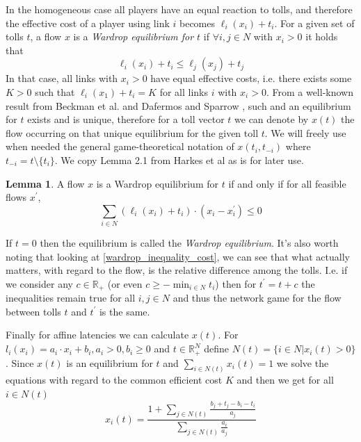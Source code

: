 \documentclass[10pt,a4paper]{book}
\newcommand{\R}{\mathbb{R}}
\theoremstyle{definition}
\newtheorem{lemma}[definition]{Lemma}
\theoremstyle{comment}
\begin{document}
In the homogeneous case all players have an equal reaction to tolls, and therefore the effective cost of a player using link $i$ becomes $\ell_i(x_i) + t_i$.
For a given set of tolls $t$, a flow $x$ is a \textit{Wardrop equilibrium for $t$} if $\forall i, j \in N$ with $x_i > 0$ it holds that
\begin{equation}
	\label{wardrop_inequality_cost}
	\ell_i(x_i) + t_i \leq \ell_j(x_j) + t_j
\end{equation}
In that case, all links with $x_i > 0$ have equal effective costs, i.e. there exists some $K > 0$ such that $\ell_i(x_1) + t_i = K$ for all links $i$ with $x_i > 0$.
From a well-known result from Beckman et al. \cite{beckmann1956studies} and Dafermos and Sparrow \cite{1363388843888284416}, such and an equilibrium for $t$ exists and is unique, therefore for a toll vector $t$ we can denote by $x(t)$ the flow occurring on  that unique equilibrium for the given toll $t$.
We will freely use when needed the general game-theoretical notation of $x(t_i, t_{-i})$ where $t_{-i} = t \setminus \{t_i\}$.
We copy Lemma 2.1 from Harkes et al \cite{Harks_2019} as is for later use.
\begin{lemma}
	\label{lemma:wardrop_equilibrium}
	A flow $x$ is a Wardrop equilibrium for $t$ if and only if for all feasible flows $x^\prime$,
	\[\sum_{i \in N} (\ell_i(x_i) + t_i) \cdot (x_i - x_i^\prime) \leq 0\]
\end{lemma}
If $t = 0$ then the equilibrium is called the \textit{Wardrop equilibrium}.
It's also worth noting that looking at \eqref{wardrop_inequality_cost}, we can see that what actually matters, with regard to the flow, is the relative difference among the tolls.
I.e. if we consider any $c \in \R_+$ (or even $c \geq -\min_{i \in N} t_i$) then for $t^\prime = t + c$ the inequalities remain true for all $i, j \in N$ and thus the network game for the flow between tolls $t$ and $t^\prime$ is the same.

Finally for affine latencies we can calculate $x(t)$.
For $l_i(x_i) = a_i \cdot x_i + b_i, a_i > 0, b_i \geq 0$ and $t \in \R_+^N$ define $N(t) = \{i \in N | x_i(t) > 0\}$.
Since $x(t)$ is an equilibrium for $t$ and $\sum_{i \in N(t)}x_i(t) = 1$ we solve the equations with regard to the common efficient cost $K$ and then we get for all $i \in N(t)$
\begin{equation}
	x_i(t) = \frac{1 + \sum_{j \in N(t)}\frac{b_j + t_j - b_i - t_i}{a_j}}{\sum_{j \in N(t)}\frac{a_i}{a_j}}
\end{equation}
\end{document}
